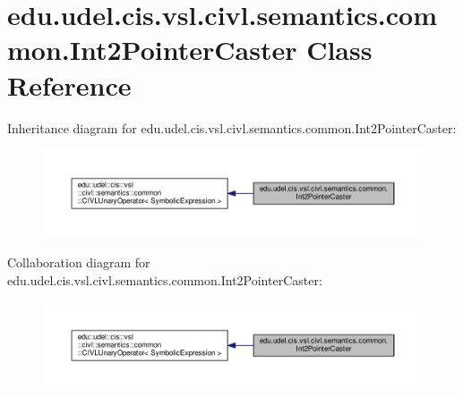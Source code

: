 \hypertarget{classedu_1_1udel_1_1cis_1_1vsl_1_1civl_1_1semantics_1_1common_1_1Int2PointerCaster}{}\section{edu.\+udel.\+cis.\+vsl.\+civl.\+semantics.\+common.\+Int2\+Pointer\+Caster Class Reference}
\label{classedu_1_1udel_1_1cis_1_1vsl_1_1civl_1_1semantics_1_1common_1_1Int2PointerCaster}


Inheritance diagram for edu.\+udel.\+cis.\+vsl.\+civl.\+semantics.\+common.\+Int2\+Pointer\+Caster\+:
\nopagebreak
\begin{figure}[H]
\begin{center}
\leavevmode
\includegraphics[width=350pt]{classedu_1_1udel_1_1cis_1_1vsl_1_1civl_1_1semantics_1_1common_1_1Int2PointerCaster__inherit__graph}
\end{center}
\end{figure}


Collaboration diagram for edu.\+udel.\+cis.\+vsl.\+civl.\+semantics.\+common.\+Int2\+Pointer\+Caster\+:
\nopagebreak
\begin{figure}[H]
\begin{center}
\leavevmode
\includegraphics[width=350pt]{classedu_1_1udel_1_1cis_1_1vsl_1_1civl_1_1semantics_1_1common_1_1Int2PointerCaster__coll__graph}
\end{center}
\end{figure}
